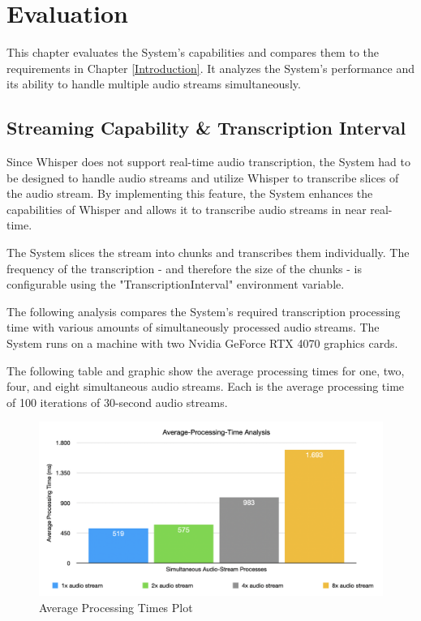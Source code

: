 \chapter{Evaluation}

\label{Evaluation}

This chapter evaluates the System's capabilities and compares them to the requirements in Chapter 
\ref{Introduction}. It analyzes the System's performance and its ability to handle multiple audio streams 
simultaneously.


\section{Streaming Capability \& Transcription Interval}

Since Whisper does not support real-time audio transcription, the System had to be designed to handle audio streams 
and utilize Whisper to transcribe slices of the audio stream. By implementing this feature, the System 
enhances the capabilities of Whisper and allows it to transcribe audio streams in near real-time.

The System slices the stream into chunks and transcribes them individually. The frequency of the transcription - 
and therefore the size of the chunks - is configurable using the "TranscriptionInterval" environment variable.

The following analysis compares the System's required transcription processing time with various amounts of 
simultaneously processed audio streams. The System runs on a machine with two Nvidia GeForce RTX 4070 graphics cards. 

The following table and graphic show the average processing times for one, two, four, and eight simultaneous audio 
streams. Each is the average processing time of 100 iterations of 30-second audio streams.

\begin{figure}[ht]
	\includegraphics[width=\textwidth]{Figures/avg-processing-times.png}
	\caption{Average Processing Times Plot}
	\label{fig:avgProcessingTimesPlot}
\end{figure}

